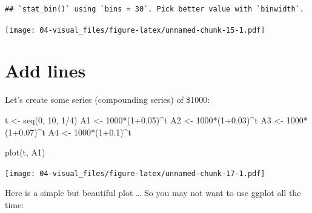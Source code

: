 \documentclass[
]{book}
\newenvironment{Shaded}{\begin{snugshade}}{\end{snugshade}}
\newcommand{\DecValTok}[1]{\textcolor[rgb]{0.00,0.00,0.81}{#1}}
\newcommand{\FloatTok}[1]{\textcolor[rgb]{0.00,0.00,0.81}{#1}}
\newcommand{\FunctionTok}[1]{\textcolor[rgb]{0.00,0.00,0.00}{#1}}
\newcommand{\NormalTok}[1]{#1}
\newcommand{\OtherTok}[1]{\textcolor[rgb]{0.56,0.35,0.01}{#1}}
\newcommand{\SpecialCharTok}[1]{\textcolor[rgb]{0.00,0.00,0.00}{#1}}
\theoremstyle{definition}
\theoremstyle{definition}
\theoremstyle{definition}
\theoremstyle{definition}
\theoremstyle{remark}
\begin{document}
\begin{verbatim}
## `stat_bin()` using `bins = 30`. Pick better value with `binwidth`.
\end{verbatim}

\texttt{[image: 04-visual\_files/figure-latex/unnamed-chunk-15-1.pdf]}

\hypertarget{add-lines}{%
\section{Add lines}\label{add-lines}}

Let's create some series (compounding series) of \$1000:

\begin{Shaded}
\begin{Highlighting}[]
\NormalTok{t }\OtherTok{\textless{}{-}} \FunctionTok{seq}\NormalTok{(}\DecValTok{0}\NormalTok{, }\DecValTok{10}\NormalTok{, }\DecValTok{1}\SpecialCharTok{/}\DecValTok{4}\NormalTok{)}
\NormalTok{A1 }\OtherTok{\textless{}{-}} \DecValTok{1000}\SpecialCharTok{*}\NormalTok{(}\DecValTok{1}\FloatTok{+0.05}\NormalTok{)}\SpecialCharTok{\^{}}\NormalTok{t}
\NormalTok{A2 }\OtherTok{\textless{}{-}} \DecValTok{1000}\SpecialCharTok{*}\NormalTok{(}\DecValTok{1}\FloatTok{+0.03}\NormalTok{)}\SpecialCharTok{\^{}}\NormalTok{t}
\NormalTok{A3 }\OtherTok{\textless{}{-}} \DecValTok{1000}\SpecialCharTok{*}\NormalTok{(}\DecValTok{1}\FloatTok{+0.07}\NormalTok{)}\SpecialCharTok{\^{}}\NormalTok{t}
\NormalTok{A4 }\OtherTok{\textless{}{-}} \DecValTok{1000}\SpecialCharTok{*}\NormalTok{(}\DecValTok{1}\FloatTok{+0.1}\NormalTok{)}\SpecialCharTok{\^{}}\NormalTok{t}
\end{Highlighting}
\end{Shaded}

\begin{Shaded}
\begin{Highlighting}[]
\FunctionTok{plot}\NormalTok{(t, A1)}
\end{Highlighting}
\end{Shaded}

\texttt{[image: 04-visual\_files/figure-latex/unnamed-chunk-17-1.pdf]}

Here is a simple but beautiful plot \ldots{} So you may not want to use ggplot all the time:
\end{document}
